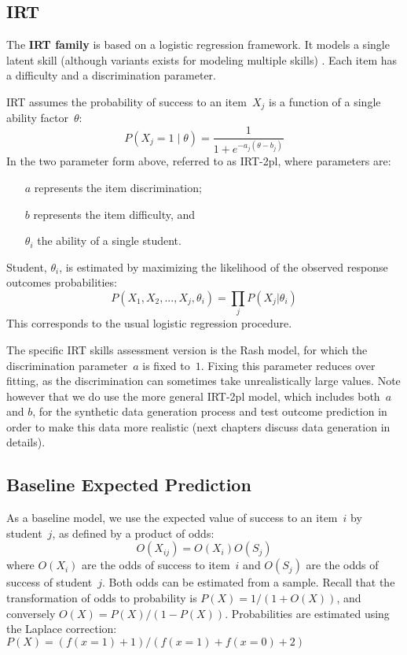 \subsection{IRT} 

The \textbf{IRT family} is based on a logistic regression framework. It models a single latent skill (although variants exists for modeling multiple skills) \cite{bakerKim2004}.  Each item has a difficulty and a discrimination parameter.

IRT assumes the probability of success to an item~$X_j$ is a function of a single ability factor~$\theta$: 
\[P(X_j\!=\!1\;|\;\theta) = \frac{1}{1+e^{-a_j(\theta-b_j)}}\]
In the two parameter form above, referred to as IRT-2pl, where parameters are:

\begin{itemize}
\item[$a$] represents the item discrimination;
\item [$b$] represents the item difficulty, and
\item [$\theta_i$] the ability of a single student.
\end{itemize}

Student, $\theta_i$, is estimated by maximizing the likelihood of the observed response outcomes probabilities:
\[ P(X_1, X_2, ..., X_j, \theta_i) = \prod_j P(X_j|\theta_i) \]
This corresponds to the usual logistic regression procedure.

The specific IRT skills assessment version is the Rash model, for which the discrimination parameter~$a$ is fixed to~$1$.  Fixing this parameter reduces over fitting, as the discrimination can sometimes take unrealistically large values. Note however that we do use the more general IRT-2pl model, which includes both~$a$ and $b$, for the synthetic data generation process and test outcome prediction in order to make this data more realistic (next chapters discuss data generation in details).

\subsection{Baseline Expected Prediction}

As a baseline model, we use the expected value of success to an item~$i$ by student~$j$, as defined by a product of odds:
\[ O(X_{ij}) =  O(X_i) O(S_j) \]
where $O(X_i)$ are the odds of success to item~$i$ and $O(S_j)$ are the odds of success of student~$j$.  Both odds can be estimated from a sample.  Recall that the transformation of odds to probability is $P(X) = 1/(1+O(X))$, and conversely $O(X) = P(X)/(1 - P(X))$. Probabilities are estimated using the Laplace correction: $P(X) = (f(x\!=\!1) + 1) / (f(x\!=\!1) + f(x\!=\!0) + 2)$



